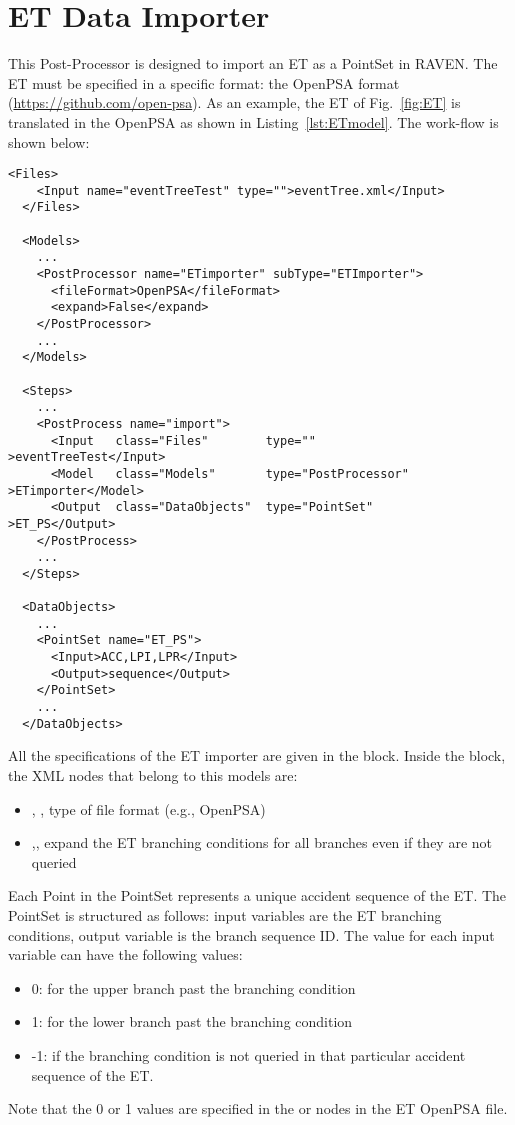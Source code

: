 \section{ET Data Importer}
\label{sec:ETdataImporter}

This Post-Processor is designed to import an ET as a PointSet in RAVEN.
The ET must be specified in a specific format: the OpenPSA format (\href{<url>}{https://github.com/open-psa}). 
As an example, the ET of Fig.~\ref{fig:ET} is translated in the OpenPSA as shown in Listing~\ref{lst:ETmodel}.
The work-flow is shown below:

\begin{lstlisting}[style=XML,morekeywords={anAttribute},caption=ET Importer input example., label=lst:ET_PP_InputExample]
  <Files>
    <Input name="eventTreeTest" type="">eventTree.xml</Input>
  </Files>
  
  <Models>
    ...
    <PostProcessor name="ETimporter" subType="ETImporter">
      <fileFormat>OpenPSA</fileFormat>
      <expand>False</expand>
    </PostProcessor> 
    ...  
  </Models>

  <Steps>
    ...
    <PostProcess name="import">
      <Input   class="Files"        type=""                >eventTreeTest</Input>
      <Model   class="Models"       type="PostProcessor"   >ETimporter</Model>
      <Output  class="DataObjects"  type="PointSet"        >ET_PS</Output>
    </PostProcess>
    ...
  </Steps>

  <DataObjects>
    ...
    <PointSet name="ET_PS">
      <Input>ACC,LPI,LPR</Input>
      <Output>sequence</Output>
    </PointSet>
    ...
  </DataObjects>
\end{lstlisting}

All the specifications of the ET importer are given in the 
 block. 
Inside the  block, the XML
nodes that belong to this models are:
\begin{itemize}
  \item  {}, , type of file format (e.g., OpenPSA)
  \item  {},, expand the ET branching conditions for all branches even if they are not queried
\end{itemize}

Each Point in the PointSet represents a unique accident sequence of the ET.
The PointSet is structured as follows: input variables are the ET branching conditions, output variable is the branch sequence ID.
The value for each input variable can have the following values:
\begin{itemize}
  \item 0: for the upper branch past the branching condition  
  \item 1: for the lower branch past the branching condition
  \item -1: if the branching condition is not queried in that particular accident sequence of the ET.
\end{itemize}
Note that the 0 or 1 values are specified in the  or  nodes in the ET OpenPSA file.

